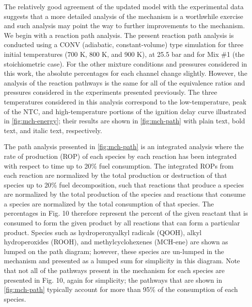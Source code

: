 \documentclass[12pt, letterpaper]{article}
\begin{document}
The relatively good agreement of the updated model with the experimental data
suggests that a more detailed analysis of the mechanism is a worthwhile
exercise and such analysis may point the way to further improvements to the
mechanism. We begin with a reaction path analysis. The present reaction path
analysis is conducted using a CONV (adiabatic, constant-volume) type simulation
for three initial temperatures (700 K, 800 K, and 900 K), at 25.5 bar and for
Mix \#1 (the stoichiometric case). For the other mixture conditions and
pressures considered in this work, the absolute percentages for each channel
change slightly. However, the analysis of the reaction pathways is the same for
all of the equivalence ratios and pressures considered in the experiments
presented previously. The three temperatures considered in this analysis
correspond to the low-temperature, peak of the NTC, and high-temperature
portions of the ignition delay curve illustrated in \autoref{fig:mch-energy};
their results are shown in \autoref{fig:mch-path} with plain text, bold text,
and italic text, respectively.

The path analysis presented in \autoref{fig:mch-path} is an integrated analysis
where the rate of production (ROP) of each species by each reaction has been
integrated with respect to time up to 20\% fuel consumption. The integrated
ROPs from each reaction are normalized by the total production or destruction
of that species up to 20\% fuel decomposition, such that reactions that produce
a species are normalized by the total production of the species and reactions
that consume a species are normalized by the total consumption of that species.
The percentages in Fig. 10 therefore represent the percent of the given
reactant that is consumed to form the given product by all reactions that can
form a particular product. Species such as hydroperoxyalkyl radicals (QOOH),
alkyl hydroperoxides (ROOH), and methylcyclohexenes (MCH-ene) are shown as
lumped on the path diagram; however, these species are un-lumped in the
mechanism and presented as a lumped sum for simplicity in this diagram. Note
that not all of the pathways present in the mechanism for each species are
presented in Fig. 10, again for simplicity; the pathways that are shown in
\autoref{fig:mch-path} typically account for more than 95\% of the consumption
of each species.
\end{document}
